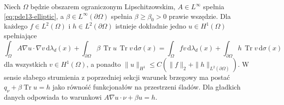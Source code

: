\begin{twierdzenie}
\label{thm:pde13-robin}
Niech $\Omega$ będzie obszarem ograniczonym Lipschitzowskim, $A\in L^\infty$ spełnia
\eqref{eq:pde13-elliptic}, a $\beta\in L^\infty(\partial\Omega)$
spełnia $\beta\geq\beta_0>0$ prawie wszędzie.
Dla każdego $f\in L^2(\Omega)$ i $h\in L^2(\partial\Omega)$
istnieje dokładnie jedno $u\in H^1(\Omega)$ spełniające
\begin{equation}\label{eq:pde13-robin}
\int_\Omega A\nabla u\cdot\nabla v\,\mathrm d\lambda_d(x)
+\int_{\partial\Omega}\beta\,\operatorname{Tr}u\,
\operatorname{Tr}v\,\mathrm d\sigma(x)
=\int_\Omega fv\,\mathrm d\lambda_d(x)
+\int_{\partial\Omega}h\,\operatorname{Tr}v\,\mathrm d\sigma(x)
\end{equation}
dla wszystkich $v\in H^1(\Omega)$, a ponadto
$\|u\|_{H^1}\leq C(\|f\|_2+\|h\|_{L^2(\partial\Omega)})$.
W sensie słabego strumienia z poprzedniej sekcji warunek
brzegowy ma postać $q_\nu+\beta\operatorname{Tr}u=h$
jako równość funkcjonałów na przestrzeni śladów.
Dla gładkich danych odpowiada to warunkowi
$A\nabla u\cdot\nu+\beta u=h$.
\end{twierdzenie}
